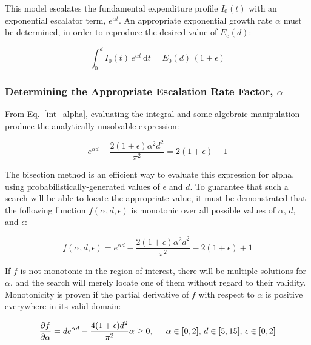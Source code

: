 \documentclass{article}
\begin{document}
This model escalates the fundamental expenditure profile $I_0(t)$ with an exponential escalator term, $e^{\alpha t}$.
An appropriate exponential growth rate $\alpha$ must be determined, in order to reproduce the desired value of $E_e(d)$:

\begin{equation}
\label{int_alpha}
  \int_0^d \! {I_0(t) \, e^{\alpha t} \, \mathrm{d}t} = E_0(d) \, \left( 1 + \epsilon \right)
\end{equation}

\subsubsection{Determining the Appropriate Escalation Rate Factor, $\alpha$}

From Eq.~\eqref{int_alpha}, evaluating the integral and some algebraic manipulation produce the analytically unsolvable expression:

\begin{equation} \label{non-an}
  e^{\alpha d} - \frac{2 (1 + \epsilon) {\alpha}^2 d^2}{\pi^2} = 2 (1 + \epsilon) - 1
\end{equation}

The bisection method is an efficient way to evaluate this expression for alpha, using probabilistically-generated values of $\epsilon$ and $d$.
To guarantee that such a search will be able to locate the appropriate value, it must be demonstrated that the following function $f(\alpha, d, \epsilon)$ is monotonic over all possible values of $\alpha$, $d$, and $\epsilon$:

\begin{equation}
  f(\alpha, d, \epsilon) = e^{\alpha d} - \frac{2 (1 + \epsilon) \alpha^2 d^2}{\pi^2} - 2 (1 + \epsilon) + 1
\end{equation}

If $f$ is not monotonic in the region of interest, there will be multiple solutions for $\alpha$, and the search will merely locate one of them without regard to their validity.
Monotonicity is proven if the partial derivative of $f$ with respect to $\alpha$ is positive everywhere in its valid domain:

\begin{equation}
  \frac{\partial f}{\partial \alpha} = d e^{\alpha d} - \frac{4 (1 + \epsilon) d^2}{\pi^2} \alpha \ge 0, \hspace{0.5 cm} \alpha \in [0, 2], \, d \in [5, 15], \, \epsilon \in [0, 2]
\end{equation}
\end{document}
